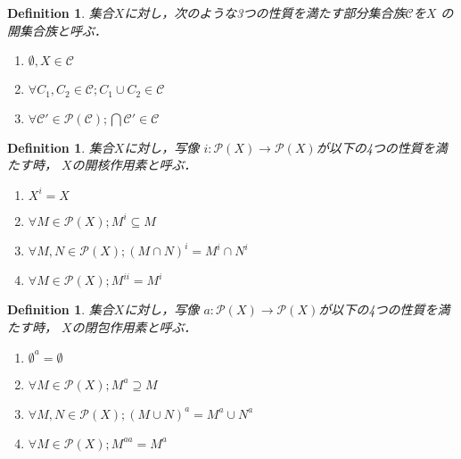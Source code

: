 \documentclass[lualatex]{ltjsbook}
\newtheorem{definition}[theorem]{Definition}
\theoremstyle{remark}
\theoremstyle{plain}
\begin{document}
\begin{definition}
	集合$X$に対し，次のような3つの性質を満たす部分集合族$\mathcal{C}$を$X$ の開集合族と呼ぶ．
	\begin{enumerate}
		\item $\emptyset ,X \in \mathcal{C}$ 
		\item $\forall C_1 , C_2 \in  \mathcal{C}; C_1 \cup C_2 \in \mathcal{C}$ 
		\item $\forall \mathcal{C}' \in \mathcal{P}(\mathcal{C}); \bigcap \mathcal{C}' \in \mathcal{C} $

	\end{enumerate}
\end{definition}

\begin{definition}
	集合$X$に対し，写像 $i: \mathcal{P}(X) \to \mathcal{P}(X)$が以下の4つの性質を満たす時， $X$の開核作用素と呼ぶ．
	 \begin{enumerate}
		\item $X^{i}=X$
		\item $\forall M \in \mathcal{P}(X); M^{i}\subseteq M$
		\item $\forall M ,N \in \mathcal{P}(X); \left( M \cap N \right) ^{i} = M^{i} \cap N^{i}$
		\item $\forall M \in \mathcal{P}(X); M^{ii}= M^{i}$
	\end{enumerate}
\end{definition}

\begin{definition}
	集合$X$に対し，写像 $a: \mathcal{P}(X) \to \mathcal{P}(X)$が以下の4つの性質を満たす時， $X$の閉包作用素と呼ぶ．
	 \begin{enumerate}
		\item $\emptyset^{a}=\emptyset$
		\item $\forall M \in \mathcal{P}(X); M^{a}\supseteq M$
		\item $\forall M ,N \in \mathcal{P}(X); \left( M \cup N \right) ^{a} = M^{a} \cup N^{a}$
		\item $\forall M \in \mathcal{P}(X); M^{aa}= M^{a}$
	\end{enumerate}

\end{definition}
\end{document}
